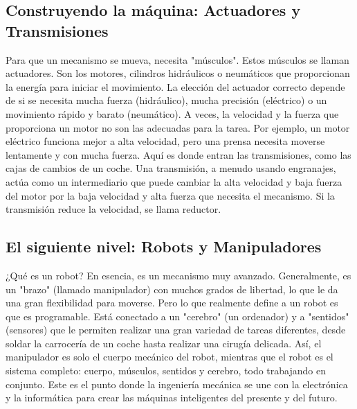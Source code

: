 \documentclass[12pt,a4paper]{article}
\begin{document}
\subsection{Construyendo la máquina: Actuadores y Transmisiones}
Para que un mecanismo se mueva, necesita "músculos". Estos músculos se llaman actuadores. Son los motores, cilindros hidráulicos o neumáticos que proporcionan la energía para iniciar el movimiento. La elección del actuador correcto depende de si se necesita mucha fuerza (hidráulico), mucha precisión (eléctrico) o un movimiento rápido y barato (neumático).
A veces, la velocidad y la fuerza que proporciona un motor no son las adecuadas para la tarea. Por ejemplo, un motor eléctrico funciona mejor a alta velocidad, pero una prensa necesita moverse lentamente y con mucha fuerza. Aquí es donde entran las transmisiones, como las cajas de cambios de un coche. Una transmisión, a menudo usando engranajes, actúa como un intermediario que puede cambiar la alta velocidad y baja fuerza del motor por la baja velocidad y alta fuerza que necesita el mecanismo. Si la transmisión reduce la velocidad, se llama reductor.

\subsection{El siguiente nivel: Robots y Manipuladores}
¿Qué es un robot? En esencia, es un mecanismo muy avanzado. Generalmente, es un "brazo" (llamado manipulador) con muchos grados de libertad, lo que le da una gran flexibilidad para moverse. Pero lo que realmente define a un robot es que es programable. Está conectado a un "cerebro" (un ordenador) y a "sentidos" (sensores) que le permiten realizar una gran variedad de tareas diferentes, desde soldar la carrocería de un coche hasta realizar una cirugía delicada.
Así, el manipulador es solo el cuerpo mecánico del robot, mientras que el robot es el sistema completo: cuerpo, músculos, sentidos y cerebro, todo trabajando en conjunto. Este es el punto donde la ingeniería mecánica se une con la electrónica y la informática para crear las máquinas inteligentes del presente y del futuro.

 

   
\end{document}
